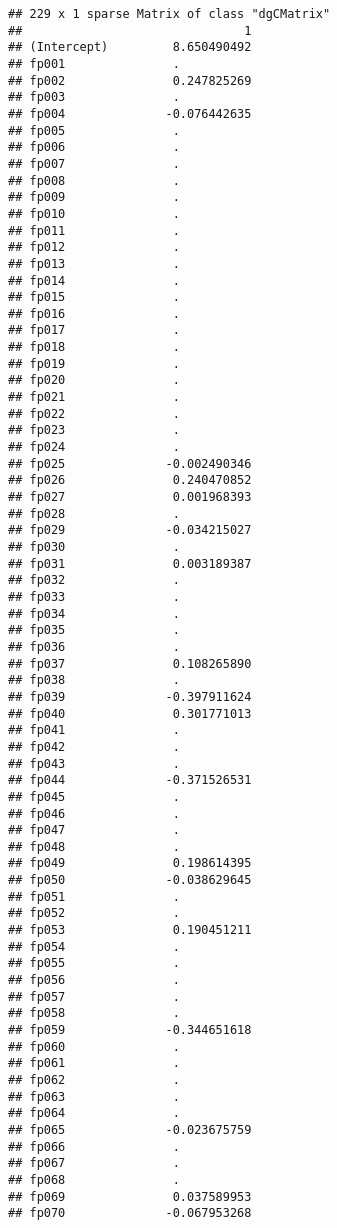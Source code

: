 \documentclass[]{article}
\begin{document}
\begin{verbatim}
## 229 x 1 sparse Matrix of class "dgCMatrix"
##                               1
## (Intercept)         8.650490492
## fp001               .          
## fp002               0.247825269
## fp003               .          
## fp004              -0.076442635
## fp005               .          
## fp006               .          
## fp007               .          
## fp008               .          
## fp009               .          
## fp010               .          
## fp011               .          
## fp012               .          
## fp013               .          
## fp014               .          
## fp015               .          
## fp016               .          
## fp017               .          
## fp018               .          
## fp019               .          
## fp020               .          
## fp021               .          
## fp022               .          
## fp023               .          
## fp024               .          
## fp025              -0.002490346
## fp026               0.240470852
## fp027               0.001968393
## fp028               .          
## fp029              -0.034215027
## fp030               .          
## fp031               0.003189387
## fp032               .          
## fp033               .          
## fp034               .          
## fp035               .          
## fp036               .          
## fp037               0.108265890
## fp038               .          
## fp039              -0.397911624
## fp040               0.301771013
## fp041               .          
## fp042               .          
## fp043               .          
## fp044              -0.371526531
## fp045               .          
## fp046               .          
## fp047               .          
## fp048               .          
## fp049               0.198614395
## fp050              -0.038629645
## fp051               .          
## fp052               .          
## fp053               0.190451211
## fp054               .          
## fp055               .          
## fp056               .          
## fp057               .          
## fp058               .          
## fp059              -0.344651618
## fp060               .          
## fp061               .          
## fp062               .          
## fp063               .          
## fp064               .          
## fp065              -0.023675759
## fp066               .          
## fp067               .          
## fp068               .          
## fp069               0.037589953
## fp070              -0.067953268

\end{verbatim}
\end{document}
